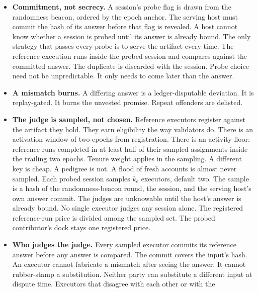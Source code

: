 \documentclass[11pt]{article}
\begin{document}
\begin{itemize}
to differ by the artifact's own error rate. Replay rests on a
registered numerics policy: float64 promotion in the head's
solve, pinned kernels, fixed reduction order. Measured: the
canonical CPU oracle reproduces the sealed heads bit-exactly on
its registered configuration, while the same computation under a
different thread configuration diverges in the last bits. The
probe therefore compares margins, never raw bits.
\item \textbf{Commitment, not secrecy.} A session's probe flag is
drawn from the randomness beacon, ordered by the epoch anchor.
The serving host must commit the
hash of its answer before that flag is revealed. A host cannot
know whether a session is probed until its answer is already
bound. The only strategy that passes every probe is to serve the
artifact every time. The reference execution runs inside the
probed session and compares against the committed answer. The
duplicate is discarded with the session. Probe choice need not be
unpredictable. It only needs to come later than the answer.
\item \textbf{A mismatch burns.} A differing answer is a
ledger-disputable deviation. It is replay-gated. It burns the
unvested promise. Repeat offenders are delisted.
\item \textbf{The judge is sampled, not chosen.} Reference
executors register against the artifact they hold. They earn
eligibility the way validators do. There is an activation window
of two epochs from registration. There is an activity floor:
reference runs completed in at least half of their sampled
assignments inside the trailing two epochs. Tenure weight applies
in the sampling. A different key is cheap. A pedigree is not. A
flood of fresh accounts is almost never sampled. Each probed
session samples $k_e$ executors, default two. The sample is a
hash of the randomness-beacon round, the session, and the serving
host's own
answer commit. The judges are unknowable until the host's answer
is already bound. No single executor judges any session alone.
The registered reference-run price is divided among the sampled
set. The probed contributor's dock stays one registered price.
\item \textbf{Who judges the judge.} Every sampled executor
commits its reference answer before any answer is compared. The
commit covers the input's hash. An executor cannot fabricate a
mismatch after seeing the answer. It cannot rubber-stamp a
substitution. Neither party can substitute a different input at
dispute time. Executors that disagree with each other or with the

\end{itemize}
\end{document}
